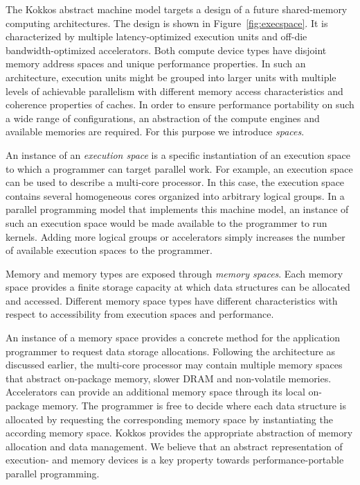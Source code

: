 The Kokkos abstract machine model targets a design of a future shared-memory computing architectures. The design is shown in Figure~\ref{fig:execspace}. It is characterized by multiple latency-optimized execution units and off-die bandwidth-optimized accelerators. Both compute device types have disjoint memory address spaces and unique performance properties. In such an architecture,   execution units might be grouped into larger units with multiple levels of achievable parallelism with different memory access characteristics and coherence properties of caches. In order to ensure performance portability on such a wide range of configurations, an abstraction of the compute engines and available memories are required. For this purpose we introduce \emph{spaces}.

An instance of an \emph{execution space} is a specific instantiation of an execution space to which a programmer can target parallel work. For example, an execution space can be used to describe a multi-core processor. In this case, the execution space contains several homogeneous cores organized into arbitrary logical groups. In a parallel programming model that implements this machine model, an instance of such an execution space would be made available to the programmer to run kernels. Adding more logical groups or accelerators simply increases the number of available execution spaces to the programmer.

Memory and memory types are exposed through \emph{memory spaces}. Each memory space provides a finite storage capacity at which data structures can be allocated and accessed. Different memory space types have different characteristics with respect to accessibility from execution spaces and performance. 

An instance of a memory space provides a concrete method for the application programmer to request data storage allocations. Following the architecture as discussed earlier, the multi-core processor may contain multiple memory spaces that abstract on-package memory, slower DRAM and non-volatile memories. Accelerators can provide an additional memory space through its local on-package memory. The programmer is free to decide where each data structure is allocated by requesting the corresponding memory space by instantiating the according memory space. Kokkos provides the appropriate abstraction of memory allocation and data management. We believe that an abstract representation of execution- and memory devices is a key property towards performance-portable parallel programming.

